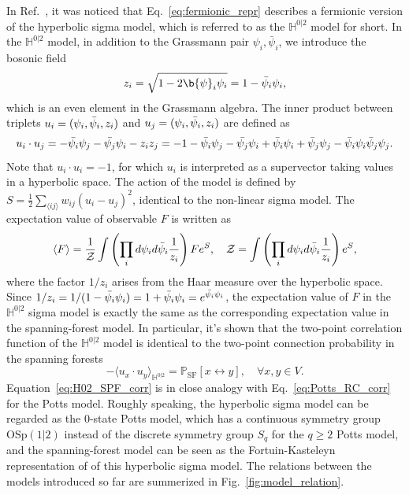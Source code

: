 In Ref.~, it was noticed that Eq.~\eqref{eq:fermionic_repr} describes a fermionic version of the hyperbolic sigma model, which 
is referred to as the $\mathbb{H}^{0|2}$ model for short. In the $\mathbb{H}^{0|2}$ model, in addition to the Grassmann pair $\psi_i, \bar{\psi}_i$, we introduce
the bosonic field
\begin{equation}
	z_i = \sqrt{1 - 2\b{\psi}_i\psi_i} = 1-\bar{\p}_i\p_i,
\end{equation}
which is an even element in the Grassmann algebra. The inner product between triplets $u_i = ({\psi}_i, \bar{{\psi}}_i, z_i)$ and 
$u_j = ({\psi}_i, \bar{{\psi}}_i, z_i)$ are defined as
\begin{equation}
	u_i \cdot u_j = -\bar{{\psi}_i}{\psi}_j - \bar{{\psi}_j}{\psi}_i - z_i z_j = -1 - \bar{{\psi}_i}{\psi}_j - \bar{{\psi}_j}{\psi}_i + \bar{{\psi}}_i{\psi}_i + \bar{{\psi}}_j{\psi}_j
	-\bar{{\psi}}_i{\psi}_i\bar{{\psi}}_j{\psi}_j.
\end{equation}
Note that $u_i \cdot u_i = -1$, for which $u_i$ is interpreted as a supervector taking values in a hyperbolic space. 
The action of the model is defined by $S = \frac{1}{2}\sum_{\langle ij \rangle} w_{ij}(u_i - u_j)^2$, identical to the non-linear sigma model.
The expectation value of observable $F$ is written as
\begin{equation}
	\langle F \rangle = \frac{1}{{\mathcal Z}} \int \left(\prod_{i}d{\psi}_i d\bar{{\psi}}_i \frac{1}{z_i}\right) F e^S,
	\quad {\mathcal Z} = \int \left(\prod_{i}d{\psi}_i d\bar{{\psi}}_i \frac{1}{z_i}\right) e^S,
\end{equation}
where the factor $1/z_i$ arises from the Haar measure over the hyperbolic space. Since $1/z_i = 1/(1-\bar{{\psi}_i}{\psi}_i) = 1 + \bar{{\psi}_i}{\psi}_i = e^{\bar{{\psi}_i}{\psi}_i}$,
the expectation value of $F$ in the $\mathbb{H}^{0|2}$ sigma model is exactly the same as the corresponding expectation value in the spanning-forest model.
In particular, it's shown that the two-point correlation function of the $\mathbb{H}^{0|2}$ model is identical to the two-point connection probability 
in the spanning forests
\begin{equation}\label{eq:H02_SPF_corr}
-\langle u_x \cdot u_y \rangle_{\mathbb{H}^{0|2}} = \mathbb{P}_{\text{SF}}[x \leftrightarrow y], \quad \forall x, y \in V.
\end{equation}
Equation~\eqref{eq:H02_SPF_corr} is in close analogy with Eq.~\eqref{eq:Potts_RC_corr} for the Potts model. Roughly speaking,
the hyperbolic sigma model can be regarded as the $0$-state Potts model, which has a continuous symmetry group $\text{OSp}(1|2)$
instead of the discrete symmetry group $S_q$ for the $q\geq2$ Potts model, and the spanning-forest model can be seen as the
Fortuin-Kasteleyn representation of of this hyperbolic sigma model. The relations between the models introduced so far are summerized in Fig.~\ref{fig:model_relation}.


